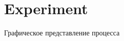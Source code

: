 \section{Experiment}
\begin{frame}{Графическое представление процесса}
\begin{minipage}[h]{0.49\linewidth}
\label{fig:image}
\end{minipage}
\begin{minipage}[h]{0.49\linewidth}

\end{minipage}
\end{frame}
